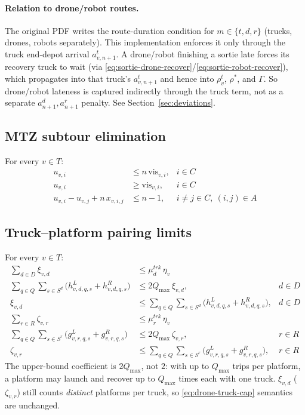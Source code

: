 \documentclass[10pt]{article}
\begin{document}
\paragraph{Relation to drone/robot routes.} The original PDF writes the
route-duration condition for $m\in\{t,d,r\}$ (trucks, drones, robots
separately). This implementation enforces it only through the truck end-depot
arrival $a^t_{v,n+1}$. A drone/robot finishing a sortie late forces its recovery
truck to wait (via \eqref{eq:sortie-drone-recover}/\eqref{eq:sortie-robot-recover}),
which propagates into that truck's $a^t_{v,n+1}$ and hence into $\rho^t_v$,
$\rho^*$, and $\Gamma$. So drone/robot lateness is captured indirectly through
the truck term, not as a separate $a^d_{n+1}, a^r_{n+1}$ penalty. See
Section~\ref{sec:deviations}.

\subsection{MTZ subtour elimination}
For every $v\in T$:
\begin{align}
u_{v,i} &\le n\,\mathrm{vis}_{v,i}, & i\in C \label{eq:mtz-upper}\\
u_{v,i} &\ge \mathrm{vis}_{v,i}, & i\in C \label{eq:mtz-lower}\\
u_{v,i} - u_{v,j} + n\,x_{v,i,j} &\le n-1, & i\ne j\in C,\ (i,j)\in A \label{eq:mtz}
\end{align}

\subsection{Truck--platform pairing limits}
For every $v\in T$:
\begin{align}
\sum_{d\in D} \xi_{v,d} &\le \mu^{trk}_d\,\eta_v \label{eq:drone-truck-cap}\\
\sum_{q\in Q}\sum_{s\in S^d}\big(h^L_{v,d,q,s} + h^R_{v,d,q,s}\big) &\le 2Q_{\max}\,\xi_{v,d}, & d\in D \label{eq:drone-truck-upper}\\
\xi_{v,d} &\le \sum_{q\in Q}\sum_{s\in S^d}\big(h^L_{v,d,q,s} + h^R_{v,d,q,s}\big), & d\in D \label{eq:drone-truck-lower}\\[4pt]
\sum_{r\in R} \zeta_{v,r} &\le \mu^{trk}_r\,\eta_v \label{eq:robot-truck-cap}\\
\sum_{q\in Q}\sum_{s\in S^r}\big(g^L_{v,r,q,s} + g^R_{v,r,q,s}\big) &\le 2Q_{\max}\,\zeta_{v,r}, & r\in R \label{eq:robot-truck-upper}\\
\zeta_{v,r} &\le \sum_{q\in Q}\sum_{s\in S^r}\big(g^L_{v,r,q,s} + g^R_{v,r,q,s}\big), & r\in R \label{eq:robot-truck-lower}
\end{align}
\noindent The upper-bound coefficient is $2Q_{\max}$, not $2$: with up to
$Q_{\max}$ trips per platform, a platform may launch and recover up to
$Q_{\max}$ times each with one truck. $\xi_{v,d}$ ($\zeta_{v,r}$) still counts
\emph{distinct} platforms per truck, so \eqref{eq:drone-truck-cap} semantics
are unchanged.
\end{document}
